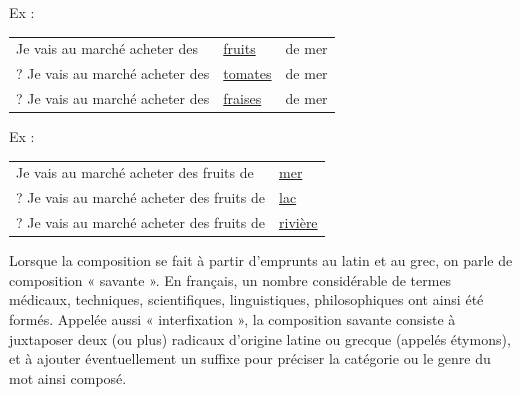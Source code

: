 \noindent Ex :\par\smallskip
\noindent\begin{tabularx}{\linewidth}{@{}Xll@{}}
Je vais au marché acheter des&\underline{fruits}&de mer\\
? Je vais au marché acheter des&\underline{tomates}&de mer\\
? Je vais au marché acheter des&\underline{fraises}&de mer\\
\end{tabularx}

\noindent Ex :\par\smallskip
\noindent\begin{tabularx}{\linewidth}{@{}Xl@{}}
Je vais au marché acheter des fruits de&\underline{mer}\\
? Je vais au marché acheter des fruits de&\underline{lac}\\
? Je vais au marché acheter des fruits de&\underline{rivière}\\
\end{tabularx}

Lorsque la composition se fait à partir d’emprunts au latin et au grec, on parle de composition « savante ». En français, un nombre considérable de termes médicaux, techniques, scientifiques, linguistiques, philosophiques ont ainsi été formés. Appelée aussi « interfixation », la composition savante consiste à juxtaposer deux (ou plus) radicaux d’origine latine ou grecque (appelés étymons), et à ajouter éventuellement un suffixe pour préciser la catégorie ou le genre du mot ainsi composé.

